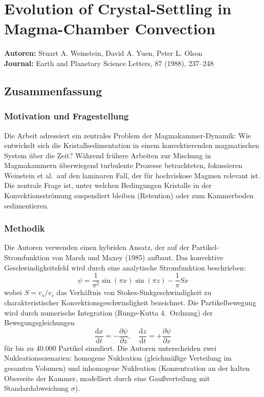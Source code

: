 \documentclass[a4paper,12pt]{article}
\begin{document}
\section*{Evolution of Crystal-Settling in Magma-Chamber Convection}
\textbf{Autoren:} Stuart A. Weinstein, David A. Yuen, Peter L. Olson \\
\textbf{Journal:} Earth and Planetary Science Letters, 87 (1988), 237--248

\subsection*{Zusammenfassung}

\subsubsection*{Motivation und Fragestellung}
Die Arbeit adressiert ein zentrales Problem der Magmakammer-Dynamik: Wie entwickelt sich die Kristallsedimentation in einem konvektierenden magmatischen System über die Zeit? Während frühere Arbeiten zur Mischung in Magmakammern überwiegend turbulente Prozesse betrachteten, fokussieren Weinstein et al.\ auf den laminaren Fall, der für hochviskose Magmen relevant ist. Die zentrale Frage ist, unter welchen Bedingungen Kristalle in der Konvektionsströmung suspendiert bleiben (Retention) oder zum Kammerboden sedimentieren.

\subsubsection*{Methodik}
Die Autoren verwenden einen hybriden Ansatz, der auf der Partikel-Stromfunktion von Marsh und Maxey (1985) aufbaut. Das konvektive Geschwindigkeitsfeld wird durch eine analytische Stromfunktion beschrieben:
\begin{equation}
\psi = \frac{1}{\pi^2} \sin(\pi x) \sin(\pi z) - \frac{1}{\pi} S x
\end{equation}
wobei $S = v_s / v_c$ das Verhältnis von Stokes-Sinkgeschwindigkeit zu charakteristischer Konvektionsgeschwindigkeit bezeichnet. Die Partikelbewegung wird durch numerische Integration (Runge-Kutta 4.\ Ordnung) der Bewegungsgleichungen
\begin{equation}
\frac{\mathrm{d}x}{\mathrm{d}t} = -\frac{\partial \psi}{\partial z}, \quad 
\frac{\mathrm{d}z}{\mathrm{d}t} = +\frac{\partial \psi}{\partial x}
\end{equation}
für bis zu 40.000 Partikel simuliert. Die Autoren unterscheiden zwei Nukleationsszenarien: homogene Nukleation (gleichmäßige Verteilung im gesamten Volumen) und inhomogene Nukleation (Konzentration an der kalten Oberseite der Kammer, modelliert durch eine Gaußverteilung mit Standardabweichung $\sigma$).
\end{document}
